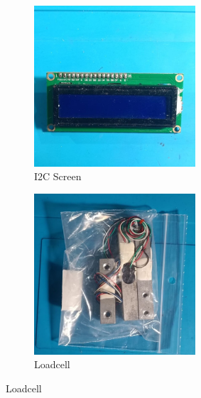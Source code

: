 \begin{figure}[H]
\begin{subfigure}{0.5\textwidth}
\includegraphics[width=0.9\linewidth, height=6cm]{medias/parts/i2c_Screen.jpg} 
\caption{I2C Screen}
\label{fig:i2c}
\end{subfigure}
\begin{subfigure}{0.5\textwidth}
\includegraphics[width=0.9\linewidth, height=6cm]{medias/parts/load_cell.jpg}
\caption{Loadcell}
\label{fig:loadcell}
\end{subfigure}


\end{figure}
